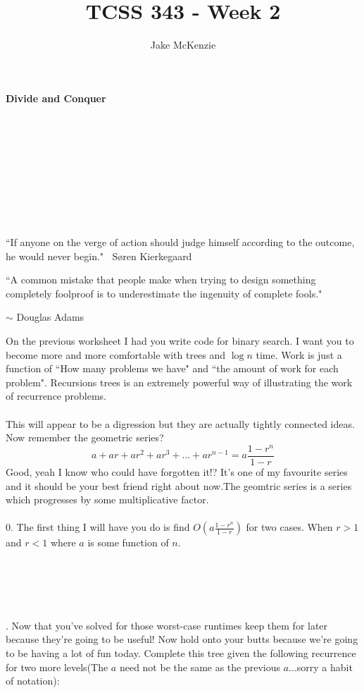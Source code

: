 \documentclass[12pt]{article}
\begin{document}
\title{TCSS 343 - Week 2}
\author{Jake McKenzie}
\maketitle
\noindent\centerline{\textbf{Divide and Conquer}}\\\\\\\\\\\\\\\\
\begin{center}
``If anyone on the verge of action should judge himself according to the outcome, he would never begin." $~$ Søren Kierkegaard
\end{center}
\begin{center}
    ``A common mistake that people make when trying to design something completely foolproof is to underestimate the ingenuity of complete fools."
\end{center}
\begin{center}
$\sim$ Douglas Adams
\end{center}
\newpage
\noindent On the previous worksheet I had you write code for binary search. I want you to become more and more comfortable with trees and $\log{n}$ time. Work is just a function of ``How many problems we have" and ``the amount of work for each problem". Recursions trees is an extremely powerful way of illustrating the work of recurrence problems.\\\\
This will appear to be a digression but they are actually tightly connected ideas. Now remember the geometric series?
$$a + ar + ar^2+ar^3+\dots + ar^{n-1} = a\frac{1-r^n}{1-r}$$
Good, yeah I know who could have forgotten it!? It's one of my favourite series and it should be your best friend right about now.The geomtric series is a series which progresses by some multiplicative factor. \\\\
0. The first thing I will have you do is find $O(a\frac{1-r^n}{1-r})$ for two cases. When $r>1$ and $r<1$ where $a$ is some function of $n$.\\\\\\\\\\\\
\newpage
{}. Now that you've solved for those worst-case runtimes keep them for later because they're going to be useful! Now hold onto your butts because we're going to be having a lot of fun today. Complete this tree given the following recurrence for two more levels(The $a$ need not be the same as the previous $a$...sorry a habit of notation):\\
\end{document}

